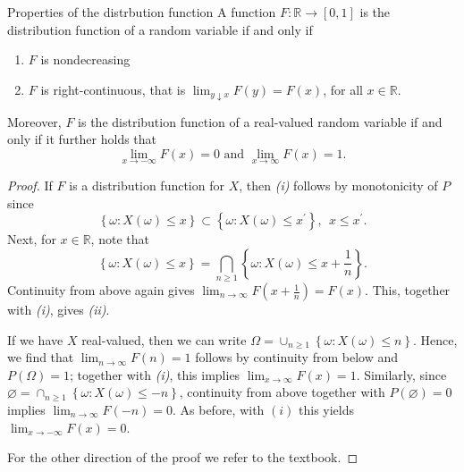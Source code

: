 \begin{thrm}{Properties of the distrbution function}{}
A function \( F:\mathbb{R} \to [0,1] \) is the distribution function of a random variable if and only if 
\begin{enumerate}[label = \emph{\roman*.)}]
    \item \( F \) is nondecreasing
    \item \( F \) is right-continuous, that is \( \lim_{y \downarrow x} F(y) = F(x) \), for all \( x \in \mathbb{R}  \).  
\end{enumerate}
Moreover, \( F \) is the distribution function of a real-valued random variable if and only if it further holds that 
\[
    \lim_{x \to - \infty }F(x) = 0  \text{ and } \lim_{x \to \infty} F(x) = 1.
\]
\tcbline

\begin{proof}
If \( F \) is a distribution function for \( X \), then \emph{(i)} follows by monotonicity of \( P \) since 
\[
    \left\{ \omega :X(\omega )\leq x \right\} \subset \left\{ \omega :X(\omega )\leq x^\prime  \right\}, \ \ x \leq x^\prime .
\]
Next, for \( x \in \mathbb{R}  \), note that 
\[
    \left\{ \omega :X(\omega )\leq x \right\}  = \bigcap_{n\geq 1} \left\{ \omega :X(\omega )\leq x + \frac{1}{n}\right\}.
\]
Continuity from above again gives \( \lim_{n \to \infty} F(x + \frac{1}{n}) = F(x). \) This, together with \emph{(i)}, gives \emph{(ii)}.

If we have \( X \) real-valued, then we can write \( \Omega = \cup _{n\geq 1}\left\{ \omega :X(\omega )\leq n \right\}  \). Hence, we find that \( \lim_{n \to \infty} F(n) = 1 \)  follows by continuity from below and \(P(\Omega ) = 1\); together with \emph{(i)}, this implies \( \lim_{x \to \infty} F(x) = 1 \). Similarly, since \( \varnothing = \cap _{n\geq 1}\left\{ \omega :X(\omega )\leq - n \right\}  \), continuity from above together with \( P(\varnothing ) = 0 \) implies \( \lim_{n \to \infty}F(- n) = 0  \). As before, with \( (i) \) this yields \( \lim_{x \to - \infty }F(x) = 0  \). 

For the other direction of the proof we refer to the textbook.
\end{proof}

\end{thrm}